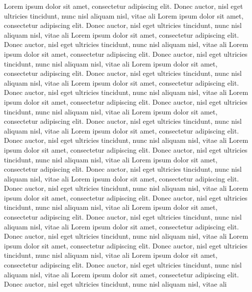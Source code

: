 	Lorem ipsum dolor sit amet, consectetur adipiscing elit. Donec auctor, nisl eget ultricies tincidunt, nunc nisl aliquam nisl, vitae ali Lorem ipsum dolor sit amet, consectetur adipiscing elit. Donec auctor, nisl eget ultricies tincidunt, nunc nisl aliquam nisl, vitae ali Lorem ipsum dolor sit amet, consectetur adipiscing elit. Donec auctor, nisl eget ultricies tincidunt, nunc nisl aliquam nisl, vitae ali Lorem ipsum dolor sit amet, consectetur adipiscing elit. Donec auctor, nisl eget ultricies tincidunt, nunc nisl aliquam nisl, vitae ali Lorem ipsum dolor sit amet, consectetur adipiscing elit. Donec auctor, nisl eget ultricies tincidunt, nunc nisl aliquam nisl, vitae ali Lorem ipsum dolor sit amet, consectetur adipiscing elit. Donec auctor, nisl eget ultricies tincidunt, nunc nisl aliquam nisl, vitae ali Lorem ipsum dolor sit amet, consectetur adipiscing elit. Donec auctor, nisl eget ultricies tincidunt, nunc nisl aliquam nisl, vitae ali Lorem ipsum dolor sit amet, consectetur adipiscing elit. Donec auctor, nisl eget ultricies tincidunt, nunc nisl aliquam nisl, vitae ali Lorem ipsum dolor sit amet, consectetur adipiscing elit. Donec auctor, nisl eget ultricies tincidunt, nunc nisl aliquam nisl, vitae ali Lorem ipsum dolor sit amet, consectetur adipiscing elit. Donec auctor, nisl eget ultricies tincidunt, nunc nisl aliquam nisl, vitae ali Lorem ipsum dolor sit amet, consectetur adipiscing elit. Donec auctor, nisl eget ultricies tincidunt, nunc nisl aliquam nisl, vitae ali Lorem ipsum dolor sit amet, consectetur adipiscing elit. Donec auctor, nisl eget ultricies tincidunt, nunc nisl aliquam nisl, vitae ali Lorem ipsum dolor sit amet, consectetur adipiscing elit. Donec auctor, nisl eget ultricies tincidunt, nunc nisl aliquam nisl, vitae ali Lorem ipsum dolor sit amet, consectetur adipiscing elit. Donec auctor, nisl eget ultricies tincidunt, nunc nisl aliquam nisl, vitae ali Lorem ipsum dolor sit amet, consectetur adipiscing elit. Donec auctor, nisl eget ultricies tincidunt, nunc nisl aliquam nisl, vitae ali Lorem ipsum dolor sit amet, consectetur adipiscing elit. Donec auctor, nisl eget ultricies tincidunt, nunc nisl aliquam nisl, vitae ali Lorem ipsum dolor sit amet, consectetur adipiscing elit. Donec auctor, nisl eget ultricies tincidunt, nunc nisl aliquam nisl, vitae ali Lorem ipsum dolor sit amet, consectetur adipiscing elit. Donec auctor, nisl eget ultricies tincidunt, nunc nisl aliquam nisl, vitae ali 

